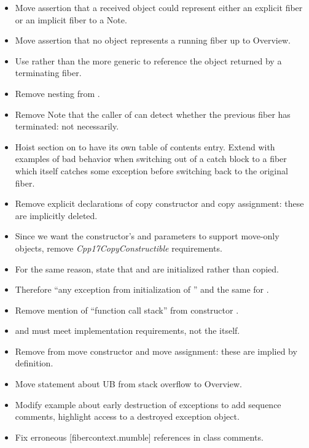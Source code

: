 \begin{itemize}
    \item Move assertion that a received \fiber object could represent either
          an explicit fiber or an implicit fiber to a Note.
    \item Move assertion that no \fiber object represents a running fiber up
          to Overview.
    \item Use  rather than the more generic 
          to reference the \fiber object returned by a terminating fiber.
    \item Remove nesting from \resumewith \except.
    \item Remove Note that the caller of \resumewith can detect whether the
          previous fiber has terminated: not necessarily.
    \item Hoist section on \exfns to have its own table of contents entry.
          Extend with examples of bad behavior when switching out of a catch
          block to a fiber which itself catches some exception before
          switching back to the original fiber.
    \item Remove explicit  declarations of copy constructor and
          copy assignment: these are implicitly deleted.
    \item Since we want the constructor's  and 
          parameters to support move-only objects,
          remove \emph{Cpp17CopyConstructible} requirements.
    \item For the same reason, state that 
          and  are initialized rather than copied.
    \item Therefore ``any exception from initialization of ''
          and the same for .
    \item Remove mention of ``function call stack'' from constructor \except.
    \item {} and  must meet implementation
          requirements, not the  itself.
    \item Remove \postcond {} from move constructor and
          move assignment: these are implied by definition.
    \item Move statement about UB from stack overflow to \fiber Overview.
    \item Modify example about early destruction of exceptions to add sequence
          comments, highlight access to a destroyed exception object.
    \item Fix erroneous [fibercontext.mumble] references in class comments.

\end{itemize}
